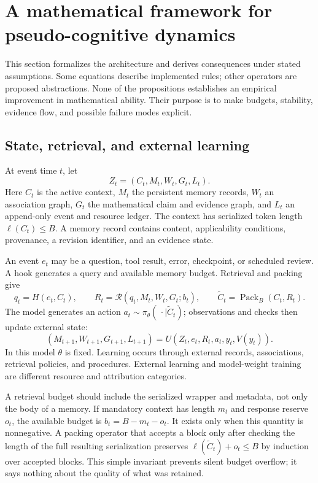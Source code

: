 \section{A mathematical framework for pseudo-cognitive dynamics}
\label{sec:dynamics}

This section formalizes the architecture and derives consequences under stated assumptions. Some equations describe implemented rules; other operators are proposed abstractions. None of the propositions establishes an empirical improvement in mathematical ability. Their purpose is to make budgets, stability, evidence flow, and possible failure modes explicit.

\subsection{State, retrieval, and external learning}

\begin{definition}
At event time $t$, let
\[
Z_t=(C_t,M_t,W_t,G_t,L_t).
\]
Here $C_t$ is the active context, $M_t$ the persistent memory records, $W_t$ an association graph, $G_t$ the mathematical claim and evidence graph, and $L_t$ an append-only event and resource ledger. The context has serialized token length $\ell(C_t)\leq B$. A memory record contains content, applicability conditions, provenance, a revision identifier, and an evidence state.
\end{definition}

An event $e_t$ may be a question, tool result, error, checkpoint, or scheduled review. A hook generates a query and available memory budget. Retrieval and packing give
\[
q_t=H(e_t,C_t),\qquad
R_t=\mathcal{R}(q_t,M_t,W_t,G_t;b_t),\qquad
\widetilde C_t=\operatorname{Pack}_{B}(C_t,R_t).
\]
The model generates an action $a_t\sim\pi_\theta(\,\cdot\mid\widetilde C_t)$; observations and checks then update external state:
\[
(M_{t+1},W_{t+1},G_{t+1},L_{t+1})
=U(Z_t,e_t,R_t,a_t,y_t,V(y_t)).
\]
In this model $\theta$ is fixed. Learning occurs through external records, associations, retrieval policies, and procedures. External learning and model-weight training are different resource and attribution categories.

A retrieval budget should include the serialized wrapper and metadata, not only the body of a memory. If mandatory context has length $m_t$ and response reserve $o_t$, the available budget is $b_t=B-m_t-o_t$. It exists only when this quantity is nonnegative. A packing operator that accepts a block only after checking the length of the full resulting serialization preserves $\ell(\widetilde C_t)+o_t\leq B$ by induction over accepted blocks. This simple invariant prevents silent budget overflow; it says nothing about the quality of what was retained.

